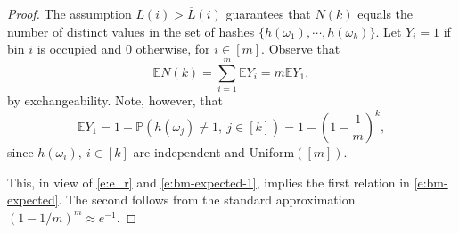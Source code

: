 \documentclass[10pt, conference, letterpaper,onecolumn]{IEEEtranv1.8}
\renewcommand\P{\mathbb P}
\newcommand\E{\mathbb E}
\theoremstyle{plain}\newtheorem{thm}{Theorem}\newtheorem{lem}{Lemma}
\theoremstyle{definition}
\begin{document}
\begin{proof} The assumption $L(i)> \overline L(i)$ guarantees that 
$N(k)$ equals the number of distinct values in the set of hashes $\{h(\omega_1),\cdots,h(\omega_k)\}$.
Let $Y_i = 1$ if bin $i$ is occupied and $0$ otherwise, for $i\in[m].$ Observe that
\begin{equation}\label{e:bm-expected-1}
\E N(k) = \sum_{i=1}^m \E Y_i = m \E Y_1,
\end{equation}
by exchangeability. Note, however, that 
$$
\E Y_1 = 1 - \P ( h(\omega_j) \not = 1,\ j\in[k]) = 1 - \left(1-\frac{1}{m} \right)^k,
$$
since $h(\omega_i),\ i\in[k]$ are independent and Uniform$([m])$.

This, in view of \eqref{e:e_r} and \eqref{e:bm-expected-1}, implies 
the first relation in \eqref{e:bm-expected}. The second follows from the standard
approximation $(1-1/m)^m \approx e^{-1}.$
\end{proof}






\small
\balance


\end{document}
